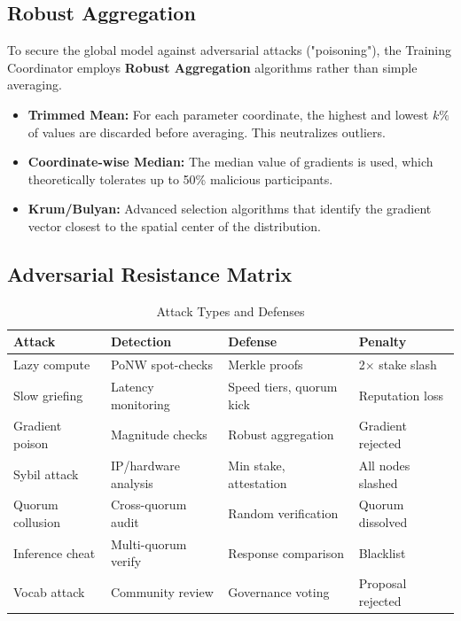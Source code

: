 \documentclass[11pt,a4paper]{article}
\begin{document}
\subsection{Robust Aggregation}
To secure the global model against adversarial attacks ("poisoning"), the Training Coordinator employs \textbf{Robust Aggregation} algorithms rather than simple averaging.

\begin{itemize}
    \item \textbf{Trimmed Mean:} For each parameter coordinate, the highest and lowest $k\%$ of values are discarded before averaging. This neutralizes outliers.
    \item \textbf{Coordinate-wise Median:} The median value of gradients is used, which theoretically tolerates up to 50\% malicious participants.
    \item \textbf{Krum/Bulyan:} Advanced selection algorithms that identify the gradient vector closest to the spatial center of the distribution.
\end{itemize}

\subsection{Adversarial Resistance Matrix}

\begin{table}[H]
\centering
\caption{Attack Types and Defenses}
\begin{tabular}{@{}llll@{}}
\toprule
\textbf{Attack} & \textbf{Detection} & \textbf{Defense} & \textbf{Penalty} \\
\midrule
Lazy compute & PoNW spot-checks & Merkle proofs & 2$\times$ stake slash \\
Slow griefing & Latency monitoring & Speed tiers, quorum kick & Reputation loss \\
Gradient poison & Magnitude checks & Robust aggregation & Gradient rejected \\
Sybil attack & IP/hardware analysis & Min stake, attestation & All nodes slashed \\
Quorum collusion & Cross-quorum audit & Random verification & Quorum dissolved \\
Inference cheat & Multi-quorum verify & Response comparison & Blacklist \\
Vocab attack & Community review & Governance voting & Proposal rejected \\
\bottomrule
\end{tabular}
\end{table}
\end{document}
